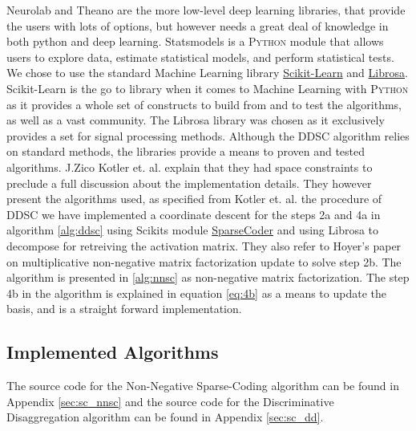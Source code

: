 Neurolab and Theano are the more low-level deep learning libraries, that provide the users with lots of options, but however needs a great deal of knowledge in both python and deep learning. Statsmodels is a \textsc{Python} module that allows users to explore data, estimate statistical models, and perform statistical tests. We chose to use the standard Machine Learning library \href{www.scikit-learn.org}{Scikit-Learn}  and \href{http://theremin.ucsd.edu/~bmcfee/librosadoc/index.html}{Librosa}. Scikit-Learn is the go to library when it comes to Machine Learning with \textsc{Python} as it provides a whole set of constructs to build from and to test the algorithms, as well as a vast community. The Librosa library was chosen as it exclusively provides a set for signal processing methods. Although the DDSC algorithm relies on standard methods, the libraries provide a means to proven and tested algorithms. J.Zico Kotler et. al. explain that they had space constraints to preclude a full discussion about the implementation details. They however present the algorithms used, as specified from Kotler et. al. \cite{DDSC} the procedure of DDSC we have implemented a coordinate descent for the steps 2a and 4a in algorithm \ref{alg:ddsc} using Scikits module \href{http://scikit-learn.org/stable/modules/generated/sklearn.decomposition.SparseCoder.html#sklearn.decomposition.SparseCoder}{SparseCoder} and using Librosa to decompose for retreiving the activation matrix. They also refer to Hoyer's paper \cite{hoyer} on multiplicative non-negative matrix factorization update to solve step 2b. The algorithm is presented in \ref{alg:nnsc} as non-negative matrix factorization. The step 4b in the algorithm is explained in equation \ref{eq:4b} as a means to update the basis, and is a straight forward implementation.


\subsection{Implemented Algorithms}
\label{sec:implemented}
The source code for the Non-Negative Sparse-Coding algorithm can be found in Appendix \ref{sec:sc_nnsc} and the source code for the Discriminative Disaggregation algorithm can be found in Appendix \ref{sec:sc_dd}.

